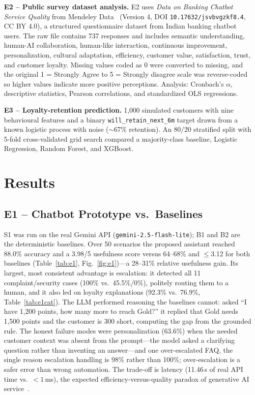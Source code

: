\documentclass[runningheads]{llncs}
\begin{document}
\noindent\textbf{E2 -- Public survey dataset analysis.} E2 uses \emph{Data on Banking Chatbot Service Quality} from Mendeley Data~\cite{ref14} (Version 4, DOI \texttt{10.17632/jsvbvgzkf8.4}, CC BY 4.0), a structured questionnaire dataset from Indian banking chatbot users. The raw file contains 737 responses and includes semantic understanding, human-AI collaboration, human-like interaction, continuous improvement, personalization, cultural adaptation, efficiency, customer value, satisfaction, trust, and customer loyalty. Missing values coded as 0 were converted to missing, and the original 1 = Strongly Agree to 5 = Strongly disagree scale was reverse-coded so higher values indicate more positive perceptions. Analysis: Cronbach's $\alpha$, descriptive statistics, Pearson correlations, and standardized OLS regressions.

\noindent\textbf{E3 -- Loyalty-retention prediction.} 1{,}000 simulated customers with nine behavioural features and a binary \texttt{will\_retain\_next\_6m} target drawn from a known logistic process with noise ($\sim$67\% retention). An 80/20 stratified split with 5-fold cross-validated grid search compared a majority-class baseline, Logistic Regression, Random Forest, and XGBoost.

\section{Results}

\subsection{E1 -- Chatbot Prototype vs.\ Baselines}
S1 was run on the real Gemini API (\texttt{gemini-2.5-flash-lite}); B1 and B2 are the deterministic baselines. Over 50 scenarios the proposed assistant reached 88.0\% accuracy and a 3.98/5 usefulness score versus 64--68\% and $\le$3.12 for both baselines (Table~\ref{tab:e1}, Fig.~\ref{fig:e1})---a 28--31\% relative usefulness gain. Its largest, most consistent advantage is escalation: it detected all 11 complaint/security cases (100\% vs.\ 45.5\%/0\%), politely routing them to a human, and it also led on loyalty explanations (92.3\% vs.\ 76.9\%, Table~\ref{tab:e1cat}). The LLM performed reasoning the baselines cannot: asked ``I have 1{,}200 points, how many more to reach Gold?'' it replied that Gold needs 1{,}500 points and the customer is 300 short, computing the gap from the grounded rule. The honest failure modes were personalization (63.6\%) when the needed customer context was absent from the prompt---the model asked a clarifying question rather than inventing an answer---and one over-escalated FAQ, the single reason escalation handling is 98\% rather than 100\%; over-escalation is a safer error than wrong automation. The trade-off is latency (11.46\,s of real API time vs.\ ${<}1$\,ms), the expected efficiency-versus-quality paradox of generative AI service~\cite{ref07}.
\end{document}
